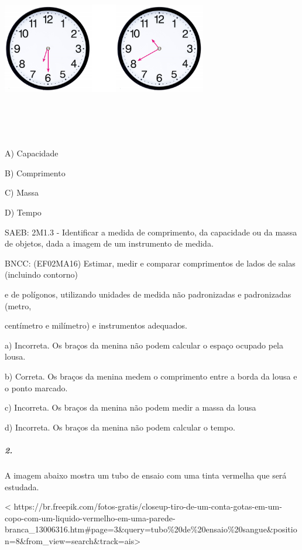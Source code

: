 \includegraphics[width=3.53125in,height=3.14257in]{media/image55.png}

A) Capacidade

B) Comprimento

C) Massa

D) Tempo

SAEB: 2M1.3 - Identificar a medida de comprimento, da capacidade ou da
massa de objetos, dada a imagem de um instrumento de medida.

BNCC: (EF02MA16) Estimar, medir e comparar comprimentos de lados de
salas (incluindo contorno)

e de polígonos, utilizando unidades de medida não padronizadas e
padronizadas (metro,

centímetro e milímetro) e instrumentos adequados.

a) Incorreta. Os braços da menina não podem calcular o espaço ocupado
pela lousa.

b) Correta. Os braços da menina medem o comprimento entre a borda da
lousa e o ponto marcado.

c) Incorreta. Os braços da menina não podem medir a massa da lousa

d) Incorreta. Os braços da menina não podem calcular o tempo.

\subparagraph{2. }\label{section-40}

A imagem abaixo mostra um tubo de ensaio com uma tinta vermelha que será
estudada.

\textless{}
https://br.freepik.com/fotos-gratis/closeup-tiro-de-um-conta-gotas-em-um-copo-com-um-liquido-vermelho-em-uma-parede-branca\_13006316.htm\#page=3\&query=tubo\%20de\%20ensaio\%20sangue\&position=8\&from\_view=search\&track=ais\textgreater{}

